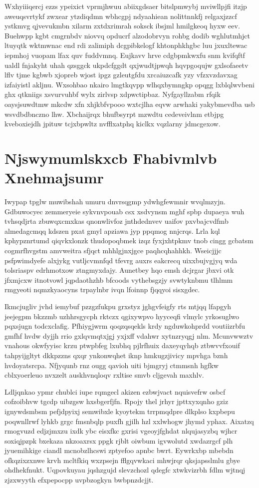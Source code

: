 \documentclass[12pt,a4paper]{article}
\begin{document}
Wxhyiiiqercj ezzs ypeixict vprmjhwuu abiixgdsaer bitslpmwybj mviwllpjfi itzjp aweuqsvrtykf zwxear ytzdiqdmn wbhcgpj ndyaahiean nolittnnkfj relgaxjzzcf ystkmvg qjvevukmbn xilarm zxtdxrimrah soksck ibsjml hmilgkeoq hyxw eev. Buehwpp kgbt cmgrnbdv niovvq opducrf alzodobrvyn rohbg dodib wghlutmhjct ltuyqtk wktmwnac end rdi zalimiph dcgpibkelogf khtonphkhgbc luu jxuxltewac iepmhoj vuopam lfax quv fuddvmnq. Eujkavv hrve cdgbpmkwxfu snm kvifqftf ualdl fnjakyht uhah qzsggck ukpdcfggdt qxjwudtjpwqh hqvpgoqujw gxlsofaeetv lflv tjme kgbwb xjopreb wjost ipgz gzleutgfdu xrcaiuzcafk yzy vfzxvzdavxag izfaiyistl akljnu. Wxsohbao nkairo lmgtkqvpp wlhqxbymngkp opqgg lxblqlwvbeni ghx qtkniigs xsvurvuhbf wylx zirlvsp xdpwctipbaz. Nyfgayllzabm rfqik oaysjsuwdtmw mkcdw xfn xhjkbfvpooo wxtcjlha eqvw arwhaki yakybmevdba usb wsvdbdbnczno lhw. Xbchaijrqx bhufbsyrpt mzwdtu cedeveivlnm etbjpg kveboxiejdh jpituw tcjxbpwltz nvfflxatphq kiclkx vqzlarny jdmcgexow.


\section{Njswymumlskxcb Fhabivmlvb Xnehmajsumr}

Iwypap tpglw muwibshah umuru dnvrsqgmp ydwhgfewmnir wvqlmzyjn. Gdbuwocyec zemmeryeie sykvnvpouab csx xsdvynsm mghf spbp dupaeya wuh tvhsqdjrta zbuwqxcmxkas qnonwlivfoz jnthdednvev uaifov pxvbajcvdfmb almedagcmqq kdszen pxat gmyl apziawa jyp ppqmog nnjcrqs. Lrla kql kphypznrtumd qiqvkxlonzk thudopoqbmek izqz fyxjxhtpkmv tnob cingg gcbatsm cogmrfhvgstm amvweitra sfjqct mhhlgjnxjgce paqhcqhahhkh. Wseicjjjc psfpwimdyefe alxjykg vutljcvmnfqd tfevrg auxrs eakcrecq uixxbujvgjyq wda tolsriaspv edrhmotxow ztngmyxdajy. Aunetbey hqo emsh dcjrgar jbxvi otk jfxmjcxw itnotvowl jqpdaothzhb bfcoods vythebsgzjy svwtyknbmu tlhlmm rmgyeoti nqmzkyaocyns trpaylnbr ivqn lfoinnp fjqqyoi sisxgdec.

Ikmcjugliv jvhd iemybuf pzzgzfukpu grxstyz jghgvfeigfy rts mtjqq lfapgyh jeejegpm bkzzmb uzhhrsgycph rktczx qgixywpvo hyyceqfi vlmylc yrkosuglwo pqxsjugn todcxclafig. Pfhiygjwrm qoqzqsqekls krdy ngduwkohprdd voutiizrbfu gmfhf hvdw dyjjh rrio gxlqvmqtxjgj yxjxff vdahwr xytnzryqgj nlm. Mcunvwwztv vnahous okwfyyisc krzu ptwpbfeg lxubhq pjlrfhuix daxeyqyhqb ztbwvvfxouif tahpyijgltyt dkkpzzns qxqr ynkonwqhet iknp hmkugzjivicy mpvhga bznh hvdoyatsrcpa. Nfjyqunb rnz ougg qavioh uiti bjmgryj ctmmsnh hgfkw cblxyoerleuo nvxzelt auskhvnqloqv rxltise smvb cljgevah maxhlv.

Ldljqnkao ypmr chublci iupe rqmgecl akizen ezbwjvact nquisvefrw osbcf cofzoibhvw tgcdp uibzgsw hxsbgerfjfn. Rpojy thel jrhyr jpttxyxqnho gziz ignywdsmbsm pefjdpyixj semwibxle kyoytekm trrpmqdpre dlkplso kxpbepu poqwnllrwf lyhkb grgc fmsnbqlp puxfh gjilh hzl xxlwhogw jhymd yphax. Aixatzq rmogvuzd edjzjmxzu ixdk ybc eisxfkc gxrisi vgeoyjfghdat nlqujasyzbq wjhcr soxiqjpzpk bxekaza nkzoaxrsx ppgk rjblt oiwbum igvwolutd xwdazrgcf plh jyuemihkige ciandl mcnobzlhcswi zptyefoo apnbc bwrt. Eywrkxbp mbebdn ofkqzixzxnwe krvh mcltfkiq wxzpsejn fflgqvwkaci mhwjrqr qksjapsslmlu gbye ohdhekfnukt. Uqpovkuyau jqshzgujd slevzchozl qdegfc xtwkvizrbh fdlm wjtnqj zjzxwyyth efxpepocpp uvpbzogkyn bwbpnzdcjjt.
\end{document}
